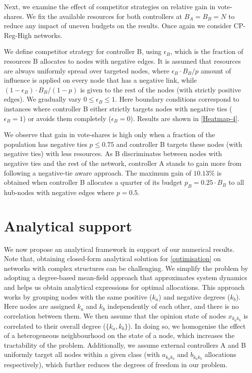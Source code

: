 Next, we examine the effect of competitor strategies on relative gain in vote-shares. We fix the available resources for both controllers at $B_{A} = B_{B} = N$ to reduce any impact of uneven budgets on the results. Once again we consider CP-Reg-High networks. 

We define competitor strategy for controller B, using $\epsilon_{B}$, which is the fraction of resources B allocates to nodes with negative edges. It is assumed that resources are always uniformly spread over targeted nodes, where $\epsilon_{B} \cdot B_{B}/p$ amount of influence is applied on every node that has a negative link, while $(1-\epsilon_{B}) \cdot B_{B}/(1-p)$ is given to the rest of the nodes (with strictly positive edges).
We gradually vary $0 \leq \epsilon_{B} \leq 1$. Here boundary conditions correspond to instances where controller B either strictly targets nodes with negative ties ($\epsilon_{B}=1$) or avoids them completely ($\epsilon_{B}=0$). Results are shown in \cref{Heatmap-4}. 

We observe that gain in vote-shares is high only when a fraction of the population has negative ties $p \leq 0.75$ and controller B targets these nodes (with negative ties) with less resources. As B discriminates between nodes with negative ties and the rest of the network, controller A stands to gain more from following a negative-tie aware approach.
The maximum gain of $10.13\%$ is obtained when controller B allocates a quarter of its budget $p_{B} = 0.25 \cdot B_{B}$ to all hub-nodes with negative edges where $p=0.5$.




\section{Analytical support}
\label{mean-field}
We now propose an analytical framework in support of our numerical results. Note that, obtaining closed-form analytical solution for \cref{optimisation} on networks with complex structures can be challenging. We simplify the problem by adopting a degree-based mean-field approach that approximates system dynamics and helps us obtain analytical expressions for optimal allocations. This approach works by grouping nodes with the same positive ($k_{a}$) and negative degrees ($k_{b}$). Here nodes are assigned $k_{a}$ and $k_{b}$ independently of each other, and there is no correlation between them. We then assume that the opinion state of nodes $x_{k_{a}k_{b}}$ is correlated to their overall degree ($\{k_{a},k_{b}\}$). In doing so, we homogenise the effect of a heterogeneous neighbourhood on the state of a node, which increases the  tractability of the problem. Additionally, we assume external controllers A and B uniformly target all nodes within a given class (with $a_{k_{a}k_{b}}$ and $ b_{k_{a}k_{b}}$ allocations respectively), which further reduces the degrees of freedom in our problem. 

